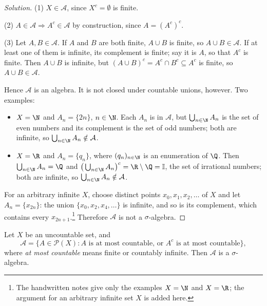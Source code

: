 \begin{proof}[Solution]
(1) $X\in\mathcal A$, since $X^c=\emptyset$ is finite.

(2) $A\in\mathcal A\Rightarrow A^c\in\mathcal A$ by construction, since $A=(A^c)^c$.

(3) Let $A,B\in\mathcal A$. If $A$ and $B$ are both finite, $A\cup B$ is finite, so
$A\cup B\in\mathcal A$. If at least one of them is infinite, its complement is finite; say it is
$A$, so that $A^c$ is finite. Then $A\cup B$ is infinite, but
$(A\cup B)^c=A^c\cap B^c\subseteq A^c$ is finite, so $A\cup B\in\mathcal A$.

Hence $\mathcal A$ is an algebra. It is not closed under countable unions, however. Two
examples:
\begin{itemize}
  \item $X=\N$ and $A_n=\{2n\}$, $n\in\N$. Each $A_n$ is in $\mathcal A$, but
    $\bigcup_{n\in\N}A_n$ is the set of even numbers and its complement is the set of odd
    numbers; both are infinite, so $\bigcup_{n\in\N}A_n\notin\mathcal A$.
  \item $X=\R$ and $A_n=\{q_n\}$, where $(q_n)_{n\in\N}$ is an enumeration of $\Q$. Then
    $\bigcup_{n\in\N}A_n=\Q$ and $\big(\bigcup_{n\in\N}A_n\big)^c=\R\setminus\Q=\mathbb I$, the
    set of irrational numbers; both are infinite, so $\bigcup_{n\in\N}A_n\notin\mathcal A$.
\end{itemize}
For an arbitrary infinite $X$, choose distinct points $x_0,x_1,x_2,\ldots$ of $X$ and let
$A_n=\{x_{2n}\}$: the union $\{x_0,x_2,x_4,\dots\}$ is infinite, and so is its complement, which
contains every $x_{2n+1}$.\footnote{The handwritten notes give only the examples $X=\N$ and
$X=\R$; the argument for an arbitrary infinite set $X$ is added here.} Therefore $\mathcal A$ is
not a $\sigma$-algebra.
\end{proof}

\begin{example}\label{exa:sa-countable-cocountable}
Let $X$ be an uncountable set, and
\[
  \mathcal A=\{A\in\mathcal P(X): A\text{ is at most countable, or }A^c\text{ is at most countable}\},
\]
where \emph{at most countable} means finite or countably infinite. Then $\mathcal A$ is a
$\sigma$-algebra.
\end{example}

